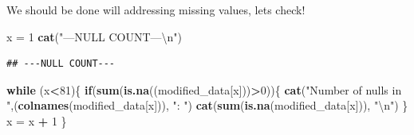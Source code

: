 \documentclass[]{article}
\newenvironment{Shaded}{\begin{snugshade}}{\end{snugshade}}
\newcommand{\KeywordTok}[1]{\textcolor[rgb]{0.13,0.29,0.53}{\textbf{#1}}}
\newcommand{\DecValTok}[1]{\textcolor[rgb]{0.00,0.00,0.81}{#1}}
\newcommand{\CharTok}[1]{\textcolor[rgb]{0.31,0.60,0.02}{#1}}
\newcommand{\StringTok}[1]{\textcolor[rgb]{0.31,0.60,0.02}{#1}}
\newcommand{\ControlFlowTok}[1]{\textcolor[rgb]{0.13,0.29,0.53}{\textbf{#1}}}
\newcommand{\OperatorTok}[1]{\textcolor[rgb]{0.81,0.36,0.00}{\textbf{#1}}}
\newcommand{\NormalTok}[1]{#1}
\begin{document}
We should be done will addressing missing values, lets check!

\begin{Shaded}
\begin{Highlighting}[]
\NormalTok{x =}\StringTok{ }\DecValTok{1}
\KeywordTok{cat}\NormalTok{(}\StringTok{"---NULL COUNT---}\CharTok{\textbackslash{}n}\StringTok{"}\NormalTok{)}
\end{Highlighting}
\end{Shaded}

\begin{verbatim}
## ---NULL COUNT---
\end{verbatim}

\begin{Shaded}
\begin{Highlighting}[]
\ControlFlowTok{while}\NormalTok{ (x}\OperatorTok{<}\DecValTok{81}\NormalTok{)\{}
  \ControlFlowTok{if}\NormalTok{(}\KeywordTok{sum}\NormalTok{(}\KeywordTok{is.na}\NormalTok{((modified_data[x]))}\OperatorTok{>}\DecValTok{0}\NormalTok{))\{}
    \KeywordTok{cat}\NormalTok{(}\StringTok{"Number of nulls in "}\NormalTok{,(}\KeywordTok{colnames}\NormalTok{(modified_data[x])), }\StringTok{": "}\NormalTok{)}
    \KeywordTok{cat}\NormalTok{(}\KeywordTok{sum}\NormalTok{(}\KeywordTok{is.na}\NormalTok{(modified_data[x])), }\StringTok{"}\CharTok{\textbackslash{}n}\StringTok{"}\NormalTok{)}
\NormalTok{  \}}
\NormalTok{  x =}\StringTok{ }\NormalTok{x }\OperatorTok{+}\StringTok{ }\DecValTok{1} 
\NormalTok{\}}
\end{Highlighting}
\end{Shaded}

\begin{Shaded}
\end{Shaded}
\end{document}

